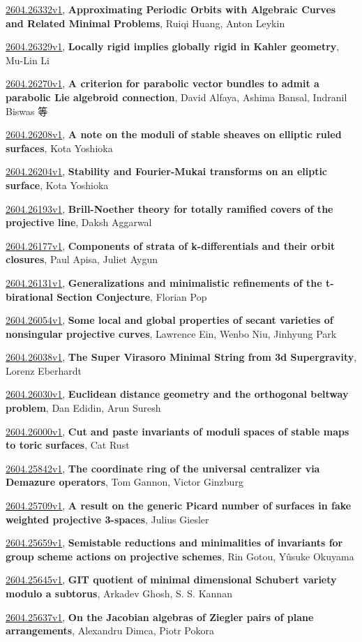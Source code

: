 \documentclass[9pt, a4paper]{article}
\theoremstyle{plain}
\theoremstyle{definition}
\theoremstyle{remark}
\newcommand{\arxiv}[3]{\href{https://arxiv.org/abs/#1}{#1}, \textbf{\textcolor{arxivblue}{#2}}, #3}
\begin{document}
\arxiv{2604.26332v1}{Approximating Periodic Orbits with Algebraic Curves and Related Minimal Problems}{Ruiqi Huang, Anton Leykin}

\arxiv{2604.26329v1}{Locally rigid implies globally rigid in Kahler geometry}{Mu-Lin Li}

\arxiv{2604.26270v1}{A criterion for parabolic vector bundles to admit a parabolic Lie algebroid connection}{David Alfaya, Ashima Bansal, Indranil Biswas 等}

\arxiv{2604.26208v1}{A note on the moduli of stable sheaves on elliptic ruled surfaces}{Kota Yoshioka}

\arxiv{2604.26204v1}{Stability and Fourier-Mukai transforms on an eliptic surface}{Kota Yoshioka}

\arxiv{2604.26193v1}{Brill-Noether theory for totally ramified covers of the projective line}{Daksh Aggarwal}

\arxiv{2604.26177v1}{Components of strata of k-differentials and their orbit closures}{Paul Apisa, Juliet Aygun}

\arxiv{2604.26131v1}{Generalizations and minimalistic refinements of the t-birational Section Conjecture}{Florian Pop}

\arxiv{2604.26054v1}{Some local and global properties of secant varieties of nonsingular projective curves}{Lawrence Ein, Wenbo Niu, Jinhyung Park}

\arxiv{2604.26038v1}{The Super Virasoro Minimal String from 3d Supergravity}{Lorenz Eberhardt}

\arxiv{2604.26030v1}{Euclidean distance geometry and the orthogonal beltway problem}{Dan Edidin, Arun Suresh}

\arxiv{2604.26000v1}{Cut and paste invariants of moduli spaces of stable maps to toric surfaces}{Cat Rust}

\arxiv{2604.25842v1}{The coordinate ring of the universal centralizer via Demazure operators}{Tom Gannon, Victor Ginzburg}

\arxiv{2604.25709v1}{A result on the generic Picard number of surfaces in fake weighted projective 3-spaces}{Julius Giesler}

\arxiv{2604.25659v1}{Semistable reductions and minimalities of invariants for group scheme actions on projective schemes}{Rin Gotou, Yûsuke Okuyama}

\arxiv{2604.25645v1}{GIT quotient of minimal dimensional Schubert variety modulo a subtorus}{Arkadev Ghosh, S. S. Kannan}

\arxiv{2604.25637v1}{On the Jacobian algebras of Ziegler pairs of plane arrangements}{Alexandru Dimca, Piotr Pokora}
\end{document}
